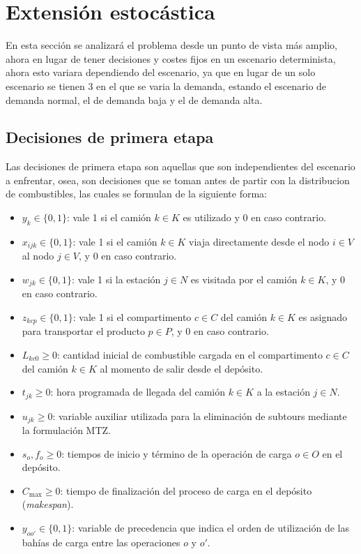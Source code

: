 \section{Extensión estocástica}
En esta sección se analizará el problema desde un punto de vista más amplio, ahora en lugar de tener decisiones y  costes fijos en un escenario determinista, ahora esto variara dependiendo del escenario, ya que en lugar de un solo escenario se tienen 3 en el que se varia la demanda, estando el escenario de demanda normal, el de demanda baja y el de demanda alta.

\subsection{Decisiones de primera etapa}
Las decisiones de primera etapa son aquellas que son independientes del escenario a enfrentar, osea, son decisiones que se toman antes de partir con la distribucion de combustibles, las cuales se formulan de la siguiente forma:

\begin{itemize}
    \item $y_k \in \{0,1\}$: vale 1 si el camión $k \in K$ es utilizado y 0 en caso contrario.

    \item $x_{ijk} \in \{0,1\}$: vale 1 si el camión $k \in K$ viaja directamente desde el nodo $i \in V$ al nodo $j \in V$, y 0 en caso contrario.

    \item $w_{jk} \in \{0,1\}$: vale 1 si la estación $j \in N$ es visitada por el camión $k \in K$, y 0 en caso contrario.

    \item $z_{kcp} \in \{0,1\}$: vale 1 si el compartimento $c \in C$ del camión $k \in K$ es asignado para transportar el producto $p \in P$, y 0 en caso contrario.

    \item $L_{kc0} \geq 0$: cantidad inicial de combustible cargada en el compartimento $c \in C$ del camión $k \in K$ al momento de salir desde el depósito.

    \item $t_{jk} \geq 0$: hora programada de llegada del camión $k \in K$ a la estación $j \in N$.

    \item $u_{jk} \geq 0$: variable auxiliar utilizada para la eliminación de subtours mediante la formulación MTZ.

    \item $s_o, f_o \geq 0$: tiempos de inicio y término de la operación de carga $o \in O$ en el depósito.

    \item $C_{\max} \geq 0$: tiempo de finalización del proceso de carga en el depósito (\textit{makespan}).

    \item $y_{oo'} \in \{0,1\}$: variable de precedencia que indica el orden de utilización de las bahías de carga entre las operaciones $o$ y $o'$.
\end{itemize}

